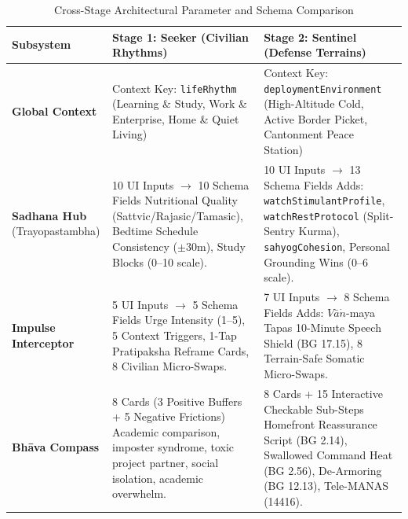 \documentclass[11pt,a4paper]{article}
\begin{document}
\begin{table}[t]
\centering
\small
\caption{Cross-Stage Architectural Parameter and Schema Comparison}
\label{tab:schema-comparison}
\begin{tabularx}{\textwidth}{p{3.0cm}p{6.8cm}X}
\toprule
\textbf{Subsystem} & \textbf{Stage 1: Seeker (Civilian Rhythms)} & \textbf{Stage 2: Sentinel (Defense Terrains)} \\
\midrule
\textbf{Global Context} & Context Key: \texttt{lifeRhythm} \newline (Learning \& Study, Work \& Enterprise, Home \& Quiet Living) & Context Key: \texttt{deploymentEnvironment} \newline (High-Altitude Cold, Active Border Picket, Cantonment Peace Station) \\
\addlinespace
\textbf{Sadhana Hub} \newline (Trayopastambha) & 10 UI Inputs $\rightarrow$ 10 Schema Fields \newline Nutritional Quality (Sattvic/Rajasic/Tamasic), Bedtime Schedule Consistency ($\pm 30$m), Study Blocks (0--10 scale). & 10 UI Inputs $\rightarrow$ 13 Schema Fields \newline Adds: \texttt{watchStimulantProfile}, \texttt{watchRestProtocol} (Split-Sentry Kurma), \texttt{sahyogCohesion}, Personal Grounding Wins (0--6 scale). \\
\addlinespace
\textbf{Impulse Interceptor} & 5 UI Inputs $\rightarrow$ 5 Schema Fields \newline Urge Intensity (1--5), 5 Context Triggers, 1-Tap Pratipaksha Reframe Cards, 8 Civilian Micro-Swaps. & 7 UI Inputs $\rightarrow$ 8 Schema Fields \newline Adds: $V\bar{a}\dot{n}$-maya Tapas 10-Minute Speech Shield (BG 17.15), 8 Terrain-Safe Somatic Micro-Swaps. \\
\addlinespace
\textbf{Bh\=ava Compass} & 8 Cards (3 Positive Buffers + 5 Negative Frictions) \newline Academic comparison, imposter syndrome, toxic project partner, social isolation, academic overwhelm. & 8 Cards + 15 Interactive Checkable Sub-Steps \newline Homefront Reassurance Script (BG 2.14), Swallowed Command Heat (BG 2.56), De-Armoring (BG 12.13), Tele-MANAS (14416). \\
\bottomrule
\end{tabularx}
\end{table}
\end{document}
